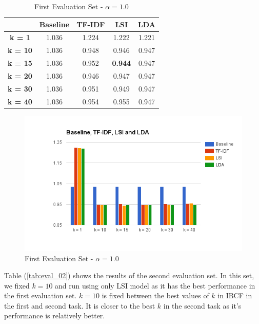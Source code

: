 \documentclass{sigish}
\begin{document}
\begin{table}[]
\centering
\begin{tabular}{|c|c|c|c|c|}
\hline
                & \textbf{Baseline} & \textbf{TF-IDF} & \textbf{LSI}   & \textbf{LDA} \\ \hline
\textbf{k = 1}  & 1.036             & 1.224           & 1.222          & 1.221            \\ \hline
\textbf{k = 10} & 1.036             & 0.948           & 0.946          & 0.947            \\ \hline
\textbf{k = 15} & 1.036             & 0.952           & \textbf{0.944} & 0.947            \\ \hline
\textbf{k = 20} & 1.036             & 0.946           & 0.947          & 0.947            \\ \hline
\textbf{k = 30} & 1.036             & 0.951           & 0.949          & 0.947            \\ \hline
\textbf{k = 40} & 1.036             & 0.954           & 0.955          & 0.947            \\ \hline
\end{tabular}
\caption{First Evaluation Set - $ \alpha = 1.0 $}
\label{tab:eval_01}
\end{table}

\begin{figure}
\centering
\includegraphics[width=\columnwidth]{images/evaluations.png}
\caption{First Evaluation Set - $ \alpha = 1.0 $}
\label{fig:eval_01}
\end{figure}

Table (\ref{tab:eval_02}) shows the results of the second evaluation set. In this set, we fixed $ k = 10 $ and run using only LSI model as it has the best performance in the first evaluation set. $ k = 10 $ is fixed between the best values of $ k $ in IBCF in the first and second task. It is closer to the best $ k $ in the second task as it's performance is relatively better.
\end{document}
